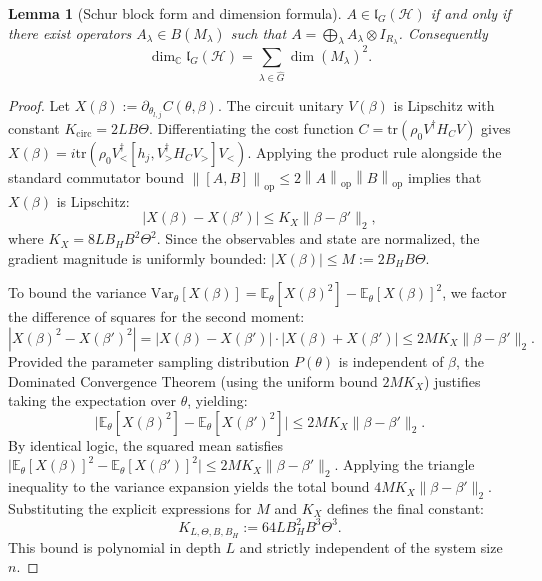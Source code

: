 \documentclass[pdflatex,sn-mathphys-num]{sn-jnl}
\theoremstyle{thmstyleone}
\newtheorem{lemma}[theorem]{Lemma}
\theoremstyle{thmstyletwo}
\theoremstyle{thmstylethree}
\newcommand{\Hil}{\mathcal{H}}
\newcommand{\lG}{\mathfrak{l}_G(\Hil)}
\newcommand{\opnorm}[1]{\left\lVert #1 \right\rVert_{\mathrm{op}}}
\begin{document}
\begin{lemma}[Schur block form and dimension formula]
\label{lem:schur}
$A \in \lG$ if and only if there exist operators $A_\lambda \in B(M_\lambda)$ such that $A = \bigoplus_\lambda A_\lambda \otimes I_{R_\lambda}$. Consequently
\begin{equation}
\dim_{\mathbb{C}} \lG = \sum_{\lambda \in \hat G} \dim(M_\lambda)^2. \label{eq:2}
\end{equation}
\end{lemma}
\begin{proof}
Let $X(\beta) := \partial_{\theta_{l,j}} C(\theta,\beta)$. The circuit unitary $V(\beta)$ is Lipschitz with constant $K_{\text{circ}} = 2LB\Theta$. Differentiating the cost function $C = \mathrm{tr}(\rho_0 V^\dagger H_C V)$ gives $X(\beta) = i \mathrm{tr}(\rho_0 V_{<}^\dagger [h_j, V_{>}^\dagger H_C V_{>}] V_{<})$. Applying the product rule alongside the standard commutator bound $\opnorm{[A,B]} \le 2\opnorm{A}\opnorm{B}$ implies that $X(\beta)$ is Lipschitz:
\begin{equation*}
|X(\beta) - X(\beta')| \le K_X \lVert \beta - \beta' \rVert_2,
\end{equation*}
where $K_X = 8 L B_H B^2 \Theta^2$. 
Since the observables and state are normalized, the gradient magnitude is uniformly bounded: $|X(\beta)| \le M := 2 B_H B \Theta$.

To bound the variance $\mathrm{Var}_\theta[X(\beta)] = \mathbb{E}_\theta[X(\beta)^2] - \mathbb{E}_\theta[X(\beta)]^2$, we factor the difference of squares for the second moment:
\begin{equation*}
|X(\beta)^2 - X(\beta')^2| = |X(\beta) - X(\beta')| \cdot |X(\beta) + X(\beta')| \le 2M K_X \lVert \beta - \beta' \rVert_2.
\end{equation*}
Provided the parameter sampling distribution $P(\theta)$ is independent of $\beta$, the Dominated Convergence Theorem (using the uniform bound $2M K_X$) justifies taking the expectation over $\theta$, yielding:
\begin{equation*}
\big|\mathbb{E}_\theta[X(\beta)^2] - \mathbb{E}_\theta[X(\beta')^2]\big| \le 2M K_X \lVert \beta - \beta' \rVert_2.
\end{equation*}
By identical logic, the squared mean satisfies $\big|\mathbb{E}_\theta[X(\beta)]^2 - \mathbb{E}_\theta[X(\beta')]^2\big| \le 2M K_X \lVert \beta - \beta' \rVert_2$.
Applying the triangle inequality to the variance expansion yields the total bound $4M K_X \lVert \beta - \beta' \rVert_2$. Substituting the explicit expressions for $M$ and $K_X$ defines the final constant:
\begin{equation*}
K_{L,\Theta,B,B_H} := 64 L B_H^2 B^3 \Theta^3.
\end{equation*}
This bound is polynomial in depth $L$ and strictly independent of the system size $n$.
\end{proof}
\end{document}
